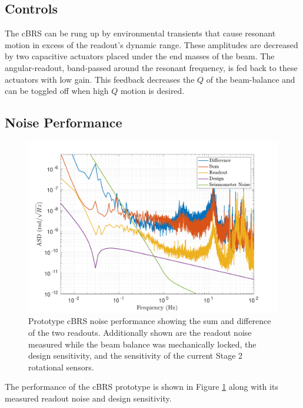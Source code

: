\documentclass [12pt, proquest]{uwthesis}[2019]
\begin{document}
\subsection{Controls}

The cBRS can be rung up by environmental transients that cause resonant motion in excess of the readout's dynamic range. These amplitudes are decreased by two capacitive actuators placed under the end masses of the beam. The angular-readout, band-passed around the resonant frequency, is fed back to these actuators with low gain. This feedback decreases the $Q$ of the beam-balance and can be toggled off when high $Q$ motion is desired. 

\subsection{Noise Performance}

\begin{figure}[!h]
\begin{center}
 \includegraphics[width=\textwidth]{cBRS_Noise.pdf}
\caption[Prototype cBRS noise performance]{Prototype cBRS noise performance showing the sum and difference of the two readouts. Additionally shown are the readout noise measured while the beam balance was mechanically locked, the design sensitivity, and the sensitivity of the current Stage 2 rotational sensors.}
\label{cBRS_noise}
\end{center}
\end{figure}

The performance of the cBRS prototype is shown in Figure \ref{cBRS_noise} along with its measured readout noise and design sensitivity. 
\end{document}
